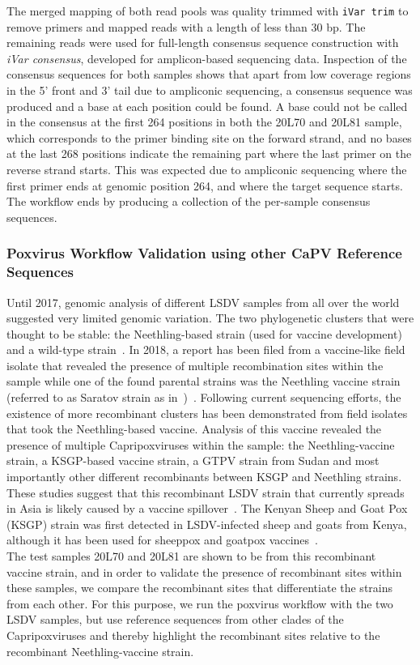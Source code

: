 The merged mapping of both read pools was quality trimmed with \texttt{iVar trim} to remove primers and mapped reads with a length of less than 30 bp. The remaining reads were used for full-length consensus sequence construction with \textit{iVar consensus}, developed for amplicon-based sequencing data. Inspection of the consensus sequences for both samples shows that apart from low coverage regions in the 5' front and 3' tail due to ampliconic sequencing, a consensus sequence was produced and a base at each position could be found. A base could not be called in the consensus at the first 264 positions in both the 20L70 and 20L81 sample, which corresponds to the primer binding site on the forward strand, and no bases at the last 268 positions indicate the remaining part where the last primer on the reverse strand starts. This was expected due to ampliconic sequencing where the first primer ends at genomic position 264, and where the target sequence starts. The workflow ends by producing a collection of the per-sample consensus sequences.

\subsubsection*{Poxvirus Workflow Validation using other CaPV Reference Sequences}
Until 2017, genomic analysis of different \ac{LSDV} samples from all over the world suggested very limited genomic variation. The two phylogenetic clusters that were thought to be stable: the Neethling-based strain (used for vaccine development) and a wild-type strain~\cite{biswas2020extended}. In 2018, a report has been filed from a vaccine-like field isolate that revealed the presence of multiple recombination sites within the sample while one of the found parental strains was the Neethling vaccine strain (referred to as Saratov strain as in~)~\cite{sprygin2018analysis}. Following current sequencing efforts, the existence of more recombinant clusters has been demonstrated from field isolates that took the Neethling-based vaccine. Analysis of this vaccine revealed the presence of multiple Capripoxviruses within the sample: the Neethling-vaccine strain, a KSGP-based vaccine strain, a \ac{GTPV} strain from Sudan and most importantly other different recombinants between KSGP and Neethling strains. These studies suggest that this recombinant \ac{LSDV} strain that currently spreads in Asia is likely caused by a vaccine spillover~\cite{vandenbussche2022recombinant}. The Kenyan Sheep and Goat Pox (KSGP) strain was first detected in \ac{LSDV}-infected sheep and goats from Kenya, although it has been used for sheeppox and goatpox vaccines~\cite{tuppurainen2014characterization}. \\
The test samples 20L70 and 20L81 are shown to be from this recombinant vaccine strain, and in order to validate the presence of recombinant sites within these samples, we compare the recombinant sites that differentiate the strains from each other. For this purpose, we run the poxvirus workflow with the two \ac{LSDV} samples, but use reference sequences from other clades of the Capripoxviruses and thereby highlight the recombinant sites relative to the recombinant Neethling-vaccine strain.

